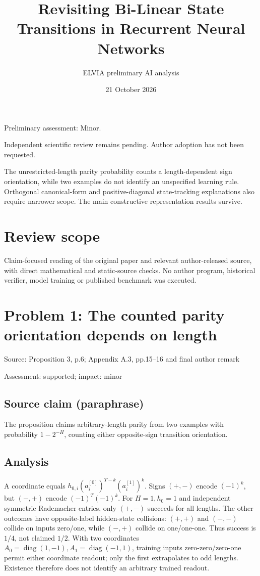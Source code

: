 \documentclass[11pt]{article}
\begin{document}
\title{Revisiting Bi-Linear State Transitions in Recurrent Neural Networks}

\author{ELVIA preliminary AI analysis}\date{21 October 2026}\maketitle

Preliminary assessment: Minor.\par

Independent scientific review remains pending. Author adoption has not been requested.

The unrestricted-length parity probability counts a length-dependent sign orientation, while two examples do not identify an unspecified learning rule. Orthogonal canonical-form and positive-diagonal state-tracking explanations also require narrower scope. The main constructive representation results survive.

\section*{Review scope}

Claim-focused reading of the original paper and relevant author-released source, with direct mathematical and static-source checks. No author program, historical verifier, model training or published benchmark was executed.

\section*{Problem 1: The counted parity orientation depends on length}

Source: Proposition 3, p.6; Appendix A.3, pp.15–16 and final author remark

Assessment: supported; impact: minor

\subsection*{Source claim (paraphrase)}

The proposition claims arbitrary-length parity from two examples with probability \(1-2^{-H}\), counting either opposite-sign transition orientation.

\subsection*{Analysis}

A coordinate equals \(h_{0,i}(a_i^{[0]})^{T-k}(a_i^{[1]})^k\). Signs \((+,-)\) encode \((-1)^k\), but \((-,+)\) encode \((-1)^T(-1)^k\). For \(H=1,h_0=1\) and independent symmetric Rademacher entries, only \((+,-)\) succeeds for all lengths. The other outcomes have opposite-label hidden-state collisions: \((+,+)\) and \((-,-)\) collide on inputs zero/one, while \((-,+)\) collide on one/one-one. Thus success is \(1/4\), not claimed \(1/2\). With two coordinates \(A_0=\operatorname{diag}(1,-1),A_1=\operatorname{diag}(-1,1)\), training inputs zero-zero/zero-one permit either coordinate readout; only the first extrapolates to odd lengths. Existence therefore does not identify an arbitrary trained readout.
\end{document}
